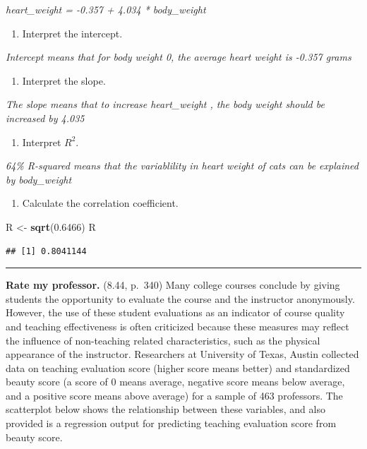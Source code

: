 \documentclass[]{article}
\newenvironment{Shaded}{\begin{snugshade}}{\end{snugshade}}
\newcommand{\FloatTok}[1]{\textcolor[rgb]{0.00,0.00,0.81}{#1}}
\newcommand{\KeywordTok}[1]{\textcolor[rgb]{0.13,0.29,0.53}{\textbf{#1}}}
\newcommand{\NormalTok}[1]{#1}
\newcommand{\StringTok}[1]{\textcolor[rgb]{0.31,0.60,0.02}{#1}}
\providecommand{\tightlist}{%
  \setlength{\itemsep}{0pt}\setlength{\parskip}{0pt}}
\begin{document}
\emph{heart\_weight = -0.357 + 4.034 * body\_weight }

\begin{enumerate}
\def\labelenumi{(\alph{enumi})}
\setcounter{enumi}{1}
\tightlist
\item
  Interpret the intercept.
\end{enumerate}

\emph{Intercept means that for body weight 0, the average heart weight
is -0.357 grams}

\begin{enumerate}
\def\labelenumi{(\alph{enumi})}
\setcounter{enumi}{2}
\tightlist
\item
  Interpret the slope.
\end{enumerate}

\emph{The slope means that to increase heart\_weight , the body weight
should be increased by 4.035}

\begin{enumerate}
\def\labelenumi{(\alph{enumi})}
\setcounter{enumi}{3}
\tightlist
\item
  Interpret \(R^2\).
\end{enumerate}

\emph{64\% R-squared means that the variablility in heart weight of cats
can be explained by body\_weight}

\begin{enumerate}
\def\labelenumi{(\alph{enumi})}
\setcounter{enumi}{4}
\tightlist
\item
  Calculate the correlation coefficient.
\end{enumerate}

\begin{Shaded}
\begin{Highlighting}[]
\NormalTok{R <-}\StringTok{ }\KeywordTok{sqrt}\NormalTok{(}\FloatTok{0.6466}\NormalTok{)}
\NormalTok{R}
\end{Highlighting}
\end{Shaded}

\begin{verbatim}
## [1] 0.8041144
\end{verbatim}

\begin{center}\rule{0.5\linewidth}{\linethickness}\end{center}

\clearpage

\textbf{Rate my professor.} (8.44, p.~340) Many college courses conclude
by giving students the opportunity to evaluate the course and the
instructor anonymously. However, the use of these student evaluations as
an indicator of course quality and teaching effectiveness is often
criticized because these measures may reflect the influence of
non-teaching related characteristics, such as the physical appearance of
the instructor. Researchers at University of Texas, Austin collected
data on teaching evaluation score (higher score means better) and
standardized beauty score (a score of 0 means average, negative score
means below average, and a positive score means above average) for a
sample of 463 professors. The scatterplot below shows the relationship
between these variables, and also provided is a regression output for
predicting teaching evaluation score from beauty score.
\end{document}
